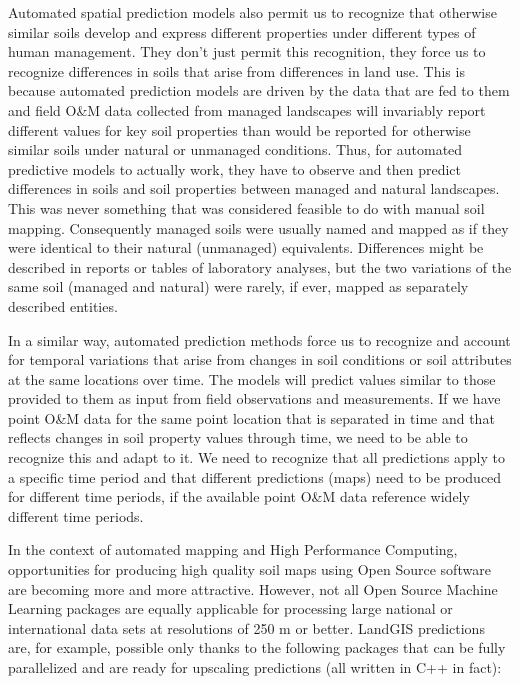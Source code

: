 \documentclass[graybox,natbib,nospthms,UStrade]{svmono}
\begin{document}
Automated spatial prediction models also permit us to recognize that
otherwise similar soils develop and express different properties under
different types of human management. They don't just permit this
recognition, they force us to recognize differences in soils that arise
from differences in land use. This is because automated prediction
models are driven by the data that are fed to them and field O\&M data
collected from managed landscapes will invariably report different
values for key soil properties than would be reported for otherwise
similar soils under natural or unmanaged conditions. Thus, for automated
predictive models to actually work, they have to observe and then
predict differences in soils and soil properties between managed and
natural landscapes. This was never something that was considered
feasible to do with manual soil mapping. Consequently managed soils were
usually named and mapped as if they were identical to their natural
(unmanaged) equivalents. Differences might be described in reports or
tables of laboratory analyses, but the two variations of the same soil
(managed and natural) were rarely, if ever, mapped as separately
described entities.

In a similar way, automated prediction methods force us to recognize and
account for temporal variations that arise from changes in soil
conditions or soil attributes at the same locations over time. The
models will predict values similar to those provided to them as input
from field observations and measurements. If we have point O\&M data for
the same point location that is separated in time and that reflects
changes in soil property values through time, we need to be able to
recognize this and adapt to it. We need to recognize that all
predictions apply to a specific time period and that different
predictions (maps) need to be produced for different time periods, if
the available point O\&M data reference widely different time periods.

In the context of automated mapping and High Performance Computing,
opportunities for producing high quality soil maps using Open Source software
are becoming more and more attractive. However, not all Open Source Machine
Learning packages are equally applicable for processing large national or
international data sets at resolutions of 250 m or better. LandGIS predictions
are, for example, possible only thanks to the following packages that can be
fully parallelized and are ready for upscaling predictions
(all written in C++ in fact):
\end{document}
